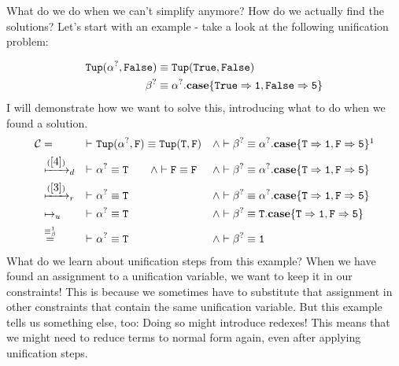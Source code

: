 \documentclass[twoside,12pt,a4paper]{article}
\begin{document}
What do we do when we can't simplify anymore? How do we actually find the solutions?
Let's start with an example - take a look at the following unification problem:
\begin{example}[Unification]
    \begin{align*}
        \mathtt{Tup(\alpha^?, False)}&\equiv \mathtt{Tup(True, False)}\\
        \beta^?&\equiv \alpha^?.\textbf{case}\{\mathtt{True \Rightarrow 1, False\Rightarrow 5}\}
    \end{align*}        
    I will demonstrate how we want to solve this, introducing what to do when we found a solution.   
    \begin{align*}
        \constraints &= &\vdash\ & \mathtt{Tup(\alphaunifvar, F)}\equiv \mathtt{Tup(T, F)}&\wedge&
        \vdash \betaunifvar\equiv \alphaunifvar.\expatmatch{\mathtt{T \Rightarrow 1, F\Rightarrow 5}}\footnotemark[1]\\
        &\xmapsto{(\ref{4})}_d &\vdash\ & \mathtt{\alphaunifvar\equiv T}\qquad\wedge\vdash \mathtt{F\equiv F} &\wedge& 
        \vdash \betaunifvar\equiv \alphaunifvar.\expatmatch{\mathtt{T \Rightarrow 1, F\Rightarrow 5}}\\
        &\xmapsto{(\ref{3})}_r &\vdash\ & \mathtt{\alphaunifvar\equiv T} &\wedge& 
        \vdash \betaunifvar\equiv \alphaunifvar.\expatmatch{\mathtt{T \Rightarrow 1, F\Rightarrow 5}}\\
        &\mapsto_u &\vdash\ &\mathtt{\alphaunifvar\equiv T} &\wedge&
        \vdash \betaunifvar\equiv \mathtt{T}.\expatmatch{\mathtt{T \Rightarrow 1, F\Rightarrow 5}}\\
        &\stackrel{\betaconv}{=} &\vdash\ &\mathtt{\alphaunifvar\equiv T} &\wedge&
        \vdash \betaunifvar\equiv \mathtt{1}
    \end{align*}
What do we learn about unification steps from this example? When we have found an assignment to a unification variable, we want to keep it in our constraints!
This is because we sometimes have to substitute that assignment in other constraints that contain the same unification variable.
But this example tells us something else, too: Doing so might introduce redexes!
This means that we might need to reduce terms to normal form again, even after applying unification steps. 
\end{example}
\end{document}
